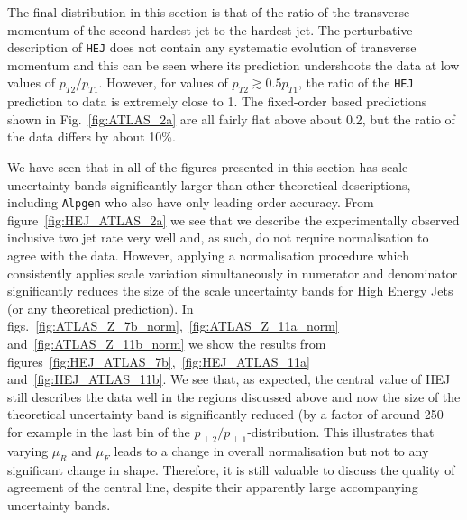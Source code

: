 		The final distribution in this section is that of the ratio of the transverse
		momentum of the second hardest jet to the hardest jet.  The perturbative
		description of \texttt{HEJ} does not contain any systematic evolution of transverse
		momentum and this can be seen where its prediction undershoots the data at low
		values of $p_{T2}/p_{T1}$.  However, for values of $p_{T2} \gtrsim 0.5 p_{T1}$,
		the ratio of the \texttt{HEJ} prediction to data is extremely close to 1.  The
		fixed-order based predictions shown in Fig.~\eqref{fig:ATLAS_2a} are all fairly
		flat above about 0.2, but the ratio of the data differs by about 10\%.

		We have seen that in all of the figures presented in this section \HEJ has scale uncertainty bands
		significantly larger than other theoretical descriptions, including \texttt{Alpgen} who also
		have only leading order accuracy.  From figure~\eqref{fig:HEJ_ATLAS_2a} we see that we describe
		the experimentally observed inclusive two jet rate very well and, as such, do not require
		normalisation to agree with the data.  However, applying a normalisation procedure which
		consistently applies scale variation simultaneously in numerator and denominator significantly
		reduces the size of the scale uncertainty bands for High Energy Jets (or any theoretical prediction).
		In figs.~\eqref{fig:ATLAS_Z_7b_norm},~\eqref{fig:ATLAS_Z_11a_norm} and~\eqref{fig:ATLAS_Z_11b_norm}
		we show the results from figures~\eqref{fig:HEJ_ATLAS_7b},~\eqref{fig:HEJ_ATLAS_11a} and~\eqref{fig:HEJ_ATLAS_11b}.
		We see that, as expected, the central value of HEJ still describes the data well in the
		regions discussed above and now the size of the theoretical uncertainty band is significantly
		reduced (by a factor of around 250 for example in the last bin of the
		$p_{\perp 2}/p_{\perp 1}$-distribution.  This illustrates that varying $\mu_R$ and $\mu_F$
		leads to a change in overall normalisation but not
		to any significant change in shape.  Therefore, it is still valuable to discuss
		the quality of agreement of the central line, despite their apparently large accompanying
		uncertainty bands.

